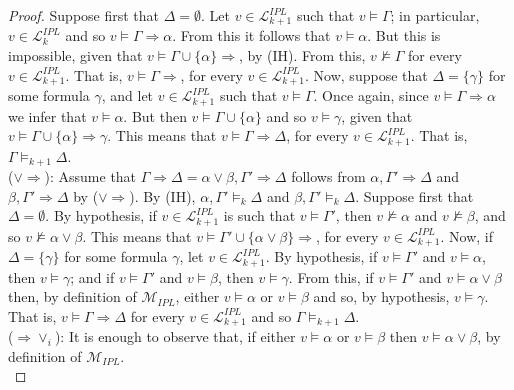 \documentclass[12pt]{article}
\begin{document}
\begin{proof}
Suppose first that $\Delta=\emptyset$.  Let $v \in \mathcal{L}_{k+1}^{IPL}$ such that $v \models\Gamma$; in particular, $v \in \mathcal{L}_{k}^{IPL}$ and so $v \models\Gamma\Rightarrow\alpha$. From this it follows that  $v\models\alpha$. But this is impossible, given that $v \models \Gamma \cup\{\alpha\} \Rightarrow$, by (IH). From this, $v \not\models\Gamma$ for every $v\in \mathcal{L}_{k+1}^{IPL}$. That is, $v\models\Gamma\Rightarrow$, for every $v\in \mathcal{L}_{k+1}^{IPL}$. Now, suppose that $\Delta=\{\gamma\}$ for some formula $\gamma$, and let $v\in \mathcal{L}_{k+1}^{IPL}$ such that $v \models \Gamma$. Once again, since $v \models\Gamma\Rightarrow\alpha$ we infer that  $v\models\alpha$. But then $v \models \Gamma \cup \{\alpha\}$ and so $v\models\gamma$, given that $v \models\Gamma \cup\{\alpha\}\Rightarrow \gamma$. This means that $v \models \Gamma\Rightarrow\Delta$, for every $v\in \mathcal{L}_{k+1}^{IPL}$. That is, $\Gamma\models_{k+1}\Delta$.\\[1mm]
%
($\vee\Rightarrow$): Assume that  $\Gamma \Rightarrow\Delta=\alpha \vee\beta,\Gamma' \Rightarrow\Delta$ follows from $\alpha, \Gamma'\Rightarrow\Delta$ and $\beta, \Gamma'\Rightarrow\Delta$ by ($\vee\Rightarrow$). By (IH),  $\alpha, \Gamma' \models_k \Delta$ and $\beta, \Gamma' \models_k \Delta$. Suppose first that $\Delta=\emptyset$. By hypothesis, if $v \in \mathcal{L}_{k+1}^{IPL}$ is such that $v\models\Gamma'$, then $v\not\models\alpha$ and $v\not\models\beta$, and so $v\not\models\alpha \vee\beta$. This means that $v \models \Gamma' \cup \{\alpha\vee\beta\}\Rightarrow$, for every $v\in \mathcal{L}_{k+1}^{IPL}$. Now, if $\Delta=\{\gamma\}$ for some formula $\gamma$, let $v\in \mathcal{L}_{k+1}^{IPL}$. By hypothesis, if  $v\models\Gamma'$ and $v\models\alpha$, then $v\models\gamma$; and if  $v\models\Gamma'$ and $v\models\beta$, then $v\models\gamma$. From this, if  $v\models\Gamma'$ and $v\models\alpha\vee\beta$ then, by definition of $\mathcal{M}_{IPL}$, either $v\models\alpha$ or $v\models\beta$  and so, by hypothesis,  $v\models\gamma$. That is, $v \models \Gamma\Rightarrow\Delta$ for every $v\in \mathcal{L}_{k+1}^{IPL}$ and so  $\Gamma\models_{k+1}\Delta$.\\[1mm]
%
($\Rightarrow\vee_i$): It is enough to observe that, if either $v\models \alpha$ or $v\models \beta$ then $v\models \alpha\vee\beta$, by definition of $\mathcal{M}_{IPL}$.\\[1mm]
%

\end{proof}
\end{document}
